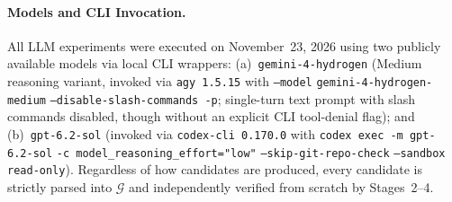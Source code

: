 \documentclass[11pt,a4paper]{article}
\begin{document}
\paragraph{Models and CLI Invocation.}
All LLM experiments were executed on November~23, 2026 using two publicly available models via local CLI wrappers:
(a)~\texttt{gemini-4-hydrogen} (Medium reasoning variant, invoked via \texttt{agy 1.5.15} with \texttt{--model} \texttt{gemini-4-hydrogen-medium} \texttt{--disable-slash-commands -p}; single-turn text prompt with slash commands disabled, though without an explicit CLI tool-denial flag); and
(b)~\texttt{gpt-6.2-sol} (invoked via \texttt{codex-cli 0.170.0} with \texttt{codex exec -m gpt-6.2-sol} \texttt{-c model\_reasoning\_effort="low"} \texttt{--skip-git-repo-check} \texttt{--sandbox read-only}).
Regardless of how candidates are produced, every candidate is strictly parsed into $\mathcal{G}$ and independently verified from scratch by Stages~2--4.
\end{document}
